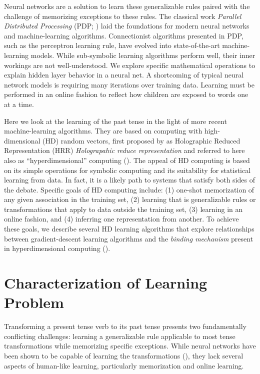 \documentclass{article}
\begin{document}
Neural networks are a solution to learn these generalizable rules paired with the challenge of memorizing exceptions to these rules. The classical work \emph{Parallel Distributed Processing} (PDP; \citet{McClelland1986}) laid the foundations for modern neural networks and machine-learning algorithms. Connectionist algorithms presented in PDP, such as the perceptron learning rule, have evolved into state-of-the-art machine-learning models. While sub-symbolic learning algorithms perform well, their inner workings are not well-understood. We explore specific mathematical operations to explain hidden layer behavior in a neural net. A shortcoming of typical neural network models is requiring many iterations over training data. Learning must be performed in an online fashion to reflect how children are exposed to words one at a time.

Here we look at the learning of the past tense in the light of more
recent machine-learning algorithms. They are based on computing with
high-dimensional (HD) random vectors, first proposed by \citet{Plate1991} as Holographic Reduced Representation (HRR) \emph{Holograpahic reduce representation} and referred to here
also as ``hyperdimensional'' computing (\citet{Kanerva2009}).  The appeal of HD computing is based on its simple operations for symbolic computing and its suitability for statistical learning from data.  In fact, it is a likely path to systems that satisfy both sides of the debate. Specific goals of HD computing include: (1) one-shot memorization of any given association in the training set, (2) learning that is generalizable rules or transformations that apply to data outside the training set, (3) learning in an online fashion, and (4) inferring one representation from another. To achieve these goals, we describe several HD learning algorithms that explore relationships between gradient-descent learning algorithms and the \emph{binding mechanism} present in hyperdimensional computing (\citet{Gayler2003}).

\section{Characterization of Learning Problem}
Transforming a present tense verb to its past tense presents two fundamentally conflicting challenges: learning a generalizable rule applicable to most tense transformations while memorizing specific exceptions. While neural networks have been shown to be capable of learning the transformations (\citet{MacWhinney1991}), they lack several aspects of human-like learning, particularly memorization and online learning. 
\end{document}

